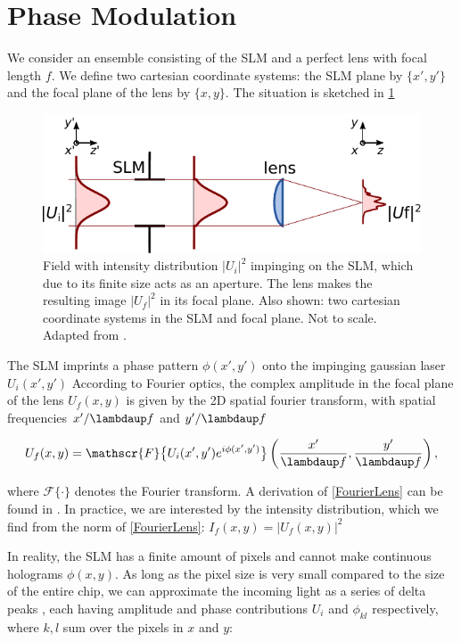 \section{Phase Modulation}

We consider an ensemble consisting of the SLM and a perfect lens with focal length $f$. We define two cartesian coordinate systems: the SLM plane by $\{x',y'\}$ and the focal plane of the lens by $\{x,y\}$. The situation is sketched in \cref{fig:SLMLens}

\begin{figure}
    \centering
    \includegraphics[width = 12cm]{figures/SLMfigure.pdf}
    \caption{Field with intensity distribution $|U_i|^2$ impinging on the SLM, which due to its finite size acts as an aperture. The lens makes the resulting image $|U_f|^2$ in its focal plane. Also shown: two cartesian coordinate systems in the SLM and focal plane. Not to scale. Adapted from \cite{Labuhn2016}.}
    \label{fig:SLMLens}
\end{figure}

The SLM imprints a phase pattern $\phi(x',y')$ onto the impinging gaussian laser $U_i(x',y')$ According to Fourier optics, the complex amplitude in the focal plane of the lens $U_f(x,y)$ is given by the 2D spatial fourier transform, with spatial frequencies $x'/\lambdaup f$ and $y'/\lambdaup f$ \cite{Bijnen2015}

\begin{equation}\label{FourierLens}
    U_f(x,y) = \mathscr{F} \big\{ U_i(x', y')e^{i \phi(x',y')} \big\} \left(\frac{x'}{\lambdaup f},\frac{y'}{\lambdaup f}\right),
\end{equation}

where $\mathscr{F}\{\cdot\}$ denotes the Fourier transform. A derivation of \cref{FourierLens} can be found in \cite{Dijk2012,Bijnen2013}. In practice, we are interested by the intensity distribution, which we find from the norm of \cref{FourierLens}: $I_f(x,y) = \left|U_f(x,y)\right|^2$

In reality, the SLM has a finite amount of pixels and cannot make continuous holograms $\phi(x,y)$. As long as the pixel size is very small compared to the size of the entire chip, we can approximate the incoming light as a series of delta peaks \cite{Bijnen2013,Labuhn2016}, each having amplitude and phase contributions $U_i$ and $\phi_{kl}$ respectively, where $k,l$ sum over the pixels in $x$ and $y$:

